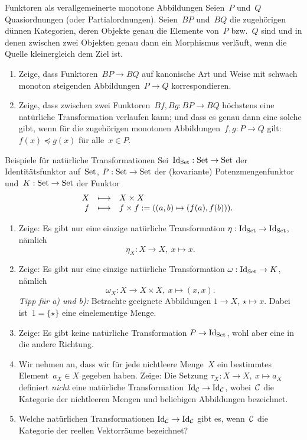\documentclass{uebblatt}
\begin{document}

\begin{aufgabe}{Funktoren als verallgemeinerte monotone Abbildungen}
Seien~$P$ und~$Q$ Quasiordnungen (oder Partialordnungen). Seien~$BP$ und~$BQ$
die zugehörigen dünnen Kategorien, deren Objekte genau die Elemente von~$P$ bzw.~$Q$
sind und in denen zwischen zwei Objekten genau dann ein Morphismus verläuft,
wenn die Quelle kleinergleich dem Ziel ist.

\begin{enumerate}
\item Zeige, dass Funktoren~$BP \to BQ$ auf kanonische Art und Weise mit
schwach monoton steigenden Abbildungen~$P \to Q$ korrespondieren.
\item Zeige, dass zwischen zwei Funktoren~$Bf, Bg : BP \to BQ$ höchstens eine
natürliche Transformation verlaufen kann; und dass es genau dann eine solche
gibt, wenn für die zugehörigen monotonen Abbildungen~$f, g : P \to Q$ gilt:
$f(x) \preceq g(x)$ für alle~$x \in P$.
\end{enumerate}
\end{aufgabe}

\begin{aufgabe}{Beispiele für natürliche Transformationen}
Sei~$\mathrm{Id}_{\mathrm{Set}} : \mathrm{Set} \to \mathrm{Set}$ der Identitätsfunktor auf~$\mathrm{Set}$, $P : \mathrm{Set} \to
\mathrm{Set}$ der (kovariante) Potenzmengenfunktor und~$K : \mathrm{Set}
\to \mathrm{Set}$ der Funktor
\[ \begin{array}{@{}rrcl@{}}
  & X &\longmapsto& X \times X \\
  & f &\longmapsto& f \times f := ((a,b) \mapsto (f(a),f(b))).
\end{array} \]
\begin{enumerate}
\item
Zeige: Es gibt nur eine einzige natürliche Transformation $\eta : \mathrm{Id}_{\mathrm{Set}}
\to \mathrm{Id}_{\mathrm{Set}}$, nämlich
\[ \eta_X : X \to X,\ x \mapsto x. \]
\item
Zeige: Es gibt nur eine einzige natürliche Transformation $\omega : \mathrm{Id}_{\mathrm{Set}}
\to K$, nämlich
\[ \omega_X : X \to X \times X,\ x \mapsto (x,x). \]
\emph{Tipp für a) und b):} Betrachte geeignete Abbildungen $1 \to X$, $\star
\mapsto x$. Dabei ist~$1 = \{\star\}$ eine einelementige Menge.
\item
Zeige: Es gibt keine natürliche Transformation $P \to \mathrm{Id}_{\mathrm{Set}}$, wohl
aber eine in die andere Richtung.
\item Wir nehmen an, dass wir für jede nichtleere Menge~$X$ ein bestimmtes
Element~$a_X \in X$ gegeben haben. Zeige:
Die Setzung
$\tau_X : X \to X,\ x \mapsto a_X$
definiert \emph{nicht} eine natürliche Transformation~$\mathrm{Id}_{\mathcal{C}} \to \mathrm{Id}_{\mathcal{C}}$,
wobei~$\mathcal{C}$ die Kategorie der nichtleeren Mengen und beliebigen Abbildungen
bezeichnet.
\item
Welche natürlichen Transformationen $\mathrm{Id}_{\mathcal{C}} \to \mathrm{Id}_{\mathcal{C}}$ gibt es,
wenn~$\mathcal{C}$ die Kategorie der reellen Vektorräume bezeichnet?
\end{enumerate}
\end{aufgabe}
\end{document}
